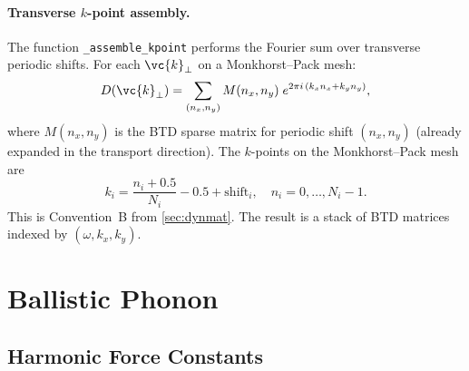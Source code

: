 \paragraph{Transverse $k$-point assembly.}
The function \texttt{\_assemble\_kpoint} performs the Fourier sum over
transverse periodic shifts.  For each $\vc{k}_\perp$ on a
Monkhorst--Pack mesh:
\begin{equation}\label{eq:assemble}
  D(\vc{k}_\perp)
  = \sum_{(n_x, n_y)} M(n_x, n_y)\;
    e^{2\pi i\,(k_x n_x + k_y n_y)},
\end{equation}
where $M(n_x, n_y)$ is the BTD sparse matrix for periodic shift
$(n_x, n_y)$ (already expanded in the transport direction).  The
$k$-points on the Monkhorst--Pack mesh are
\begin{equation}
  k_i = \frac{n_i + 0.5}{N_i} - 0.5 + \text{shift}_i,
  \quad n_i = 0, \ldots, N_i - 1.
\end{equation}
This is Convention~B from \cref{sec:dynmat}.  The result is a stack of BTD matrices
indexed by $(\omega, k_x, k_y)$.


\section{Ballistic Phonon}
\label{sec:harmonic}


\subsection{Harmonic Force Constants}
\label{sec:fd}

